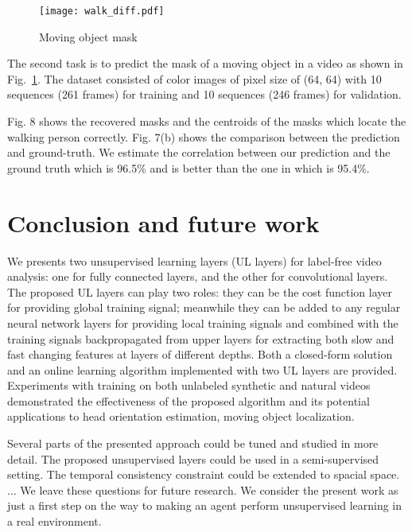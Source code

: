 \documentclass{article}
\begin{document}
\begin{figure}[h]
\begin{center}
\centerline{\texttt{[image: walk\_diff.pdf]}}
\caption{Moving object mask}
\label{mask}
\end{center}
\end{figure}


The second task is to predict the mask of a moving
object in a video as shown in Fig.~\ref{mask}. The dataset consisted of color images of
pixel size of (64, 64) with 10 sequences (261 frames) for training and 10 
sequences (246 frames) for validation. 

Fig. 8 shows the recovered masks and the centroids of the masks which locate the walking person correctly. Fig. 7(b) shows the 
comparison between the prediction and ground-truth. We estimate the correlation between our prediction and the ground truth which is 96.5\% and is better than the one in \cite{Stewart17}
which is 95.4\%. 

\section{Conclusion and future work}
We presents two unsupervised learning layers (UL layers) for label-free
 video analysis: one for fully connected layers, and the other for
convolutional layers. The proposed UL layers can play two roles: they can be
 the cost function layer for providing global training signal; meanwhile they
 can be added to any regular neural network layers for providing local training
signals and combined with the training signals backpropagated from upper layers
for extracting both slow and fast changing features at layers of
different depths.
Both a closed-form solution and an online learning algorithm implemented with
two UL layers are provided. Experiments with
 training on both unlabeled synthetic and natural videos 
demonstrated the effectiveness of the proposed algorithm and its potential 
applications to head orientation estimation, moving object localization.

Several parts of the presented approach could be tuned and studied in 
more detail. The proposed
unsupervised layers could be used in a semi-supervised setting. The temporal 
consistency constraint could be extended to spacial space. ... We leave these
questions for future research. We consider the present work as just a first 
step on the way to making an agent perform unsupervised learning in a real 
environment.
 
\end{document}
